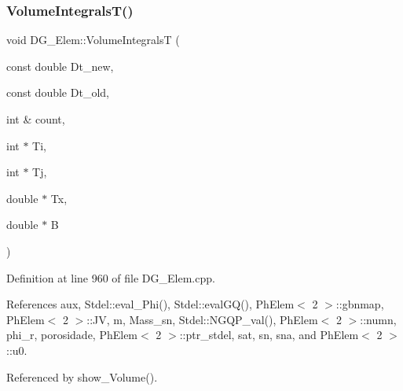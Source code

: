 \subsubsection{\texorpdfstring{Volume\+Integrals\+T()}{VolumeIntegralsT()}}
{\footnotesize\ttfamily void D\+G\+\_\+\+Elem\+::\+Volume\+IntegralsT (\begin{DoxyParamCaption}\item[{const double}]{Dt\+\_\+new,  }\item[{const double}]{Dt\+\_\+old,  }\item[{int \&}]{count,  }\item[{int $\ast$}]{Ti,  }\item[{int $\ast$}]{Tj,  }\item[{double $\ast$}]{Tx,  }\item[{double $\ast$}]{B }\end{DoxyParamCaption})}



Definition at line 960 of file D\+G\+\_\+\+Elem.\+cpp.



References aux, Stdel\+::eval\+\_\+\+Phi(), Stdel\+::eval\+G\+Q(), Ph\+Elem$<$ 2 $>$\+::gbnmap, Ph\+Elem$<$ 2 $>$\+::\+JV, m, Mass\+\_\+sn, Stdel\+::\+N\+G\+Q\+P\+\_\+val(), Ph\+Elem$<$ 2 $>$\+::numn, phi\+\_\+r, porosidade, Ph\+Elem$<$ 2 $>$\+::ptr\+\_\+stdel, sat, sn, sna, and Ph\+Elem$<$ 2 $>$\+::u0.



Referenced by show\+\_\+\+Volume().

